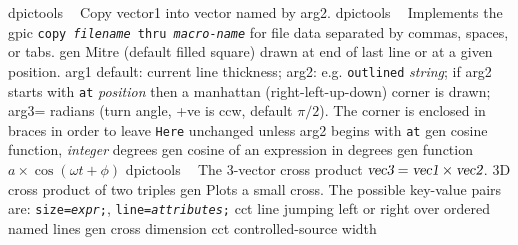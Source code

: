   {dpictools}%
  {$\;\;$ Copy vector1 into vector named by arg2.}%
%
  {dpictools}%
  {$\;\;$ Implements the gpic {\tt copy {\sl filename} thru {\sl macro-name}}
   for file data separated by commas, spaces, or tabs.}%
%
  {gen}%
  { Mitre (default filled square) drawn at end of last line or at a
    given position.
    arg1 default: current line thickness;
    arg2: e.g. {\tt outlined} {\sl string}; if arg2 starts with
    {\tt at} {\sl position} then a manhattan (right-left-up-down) corner
    is drawn;
    arg3= radians (turn angle, +ve is ccw, default $\pi/2$).
    The corner is enclosed in braces
    in order to leave {\tt Here} unchanged unless arg2 begins with {\tt at}%
    }%
%
  {gen}%
  {cosine function, {\sl integer\/} degrees}%
%
  {gen}%
  {cosine of an expression in degrees}%
%
  {gen}%
  {function $a\times\cos(\omega t + \phi)$ }%
%
  {dpictools}%
  {$\;\;$ The 3-vector cross product
    $\hbox{\sl vec3} = \hbox{\sl vec1} \times \hbox{\sl vec2}$.}%
%
  {3D}%
  {cross product of two triples}%
%
  {gen}%
  {Plots a small cross.  The possible key-value pairs are:
    {\tt size={\sl expr};},
    {\tt line={\sl attributes};} }%
%
  {cct}%
  {line jumping left or right over ordered named
   lines}%
%
  {gen}%
  {cross dimension}%
%
  {cct}%
  {controlled-source width}%

